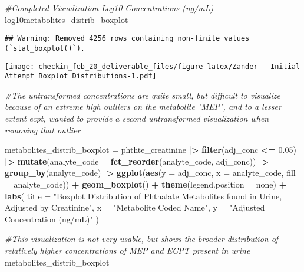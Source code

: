\documentclass[
]{article}
\newenvironment{Shaded}{\begin{snugshade}}{\end{snugshade}}
\newcommand{\AttributeTok}[1]{\textcolor[rgb]{0.13,0.29,0.53}{#1}}
\newcommand{\CommentTok}[1]{\textcolor[rgb]{0.56,0.35,0.01}{\textit{#1}}}
\newcommand{\FloatTok}[1]{\textcolor[rgb]{0.00,0.00,0.81}{#1}}
\newcommand{\FunctionTok}[1]{\textcolor[rgb]{0.13,0.29,0.53}{\textbf{#1}}}
\newcommand{\NormalTok}[1]{#1}
\newcommand{\OtherTok}[1]{\textcolor[rgb]{0.56,0.35,0.01}{#1}}
\newcommand{\SpecialCharTok}[1]{\textcolor[rgb]{0.81,0.36,0.00}{\textbf{#1}}}
\newcommand{\StringTok}[1]{\textcolor[rgb]{0.31,0.60,0.02}{#1}}
\begin{document}
\begin{Shaded}
\begin{Highlighting}[]
\CommentTok{\#Completed Visualization Log10 Concentrations (ng/mL)}
\NormalTok{log10metabolites\_distrib\_boxplot}
\end{Highlighting}
\end{Shaded}

\begin{verbatim}
## Warning: Removed 4256 rows containing non-finite values (`stat_boxplot()`).
\end{verbatim}

\texttt{[image: checkin\_feb\_20\_deliverable\_files/figure-latex/Zander - Initial Attempt Boxplot Distributions-1.pdf]}

\begin{Shaded}
\begin{Highlighting}[]
\CommentTok{\#The untransformed concentrations are quite small, but difficult to visualize because of an extreme high outliers on the metabolite "MEP", and to a lesser extent ecpt, wanted to provide a second untransformed visualization when removing that outlier}

\NormalTok{metabolites\_distrib\_boxplot }\OtherTok{=}\NormalTok{ phthte\_creatinine }\SpecialCharTok{|\textgreater{}} 
  \FunctionTok{filter}\NormalTok{(adj\_conc }\SpecialCharTok{\textless{}=} \FloatTok{0.05}\NormalTok{) }\SpecialCharTok{|\textgreater{}} 
  \FunctionTok{mutate}\NormalTok{(}\AttributeTok{analyte\_code =} \FunctionTok{fct\_reorder}\NormalTok{(analyte\_code, adj\_conc)) }\SpecialCharTok{|\textgreater{}} 
  \FunctionTok{group\_by}\NormalTok{(analyte\_code) }\SpecialCharTok{|\textgreater{}} 
  \FunctionTok{ggplot}\NormalTok{(}\FunctionTok{aes}\NormalTok{(}\AttributeTok{y =}\NormalTok{ adj\_conc, }\AttributeTok{x =}\NormalTok{ analyte\_code, }\AttributeTok{fill =}\NormalTok{ analyte\_code)) }\SpecialCharTok{+} \FunctionTok{geom\_boxplot}\NormalTok{() }\SpecialCharTok{+} \FunctionTok{theme}\NormalTok{(}\AttributeTok{legend.position =} \StringTok{\textquotesingle{}none\textquotesingle{}}\NormalTok{) }\SpecialCharTok{+}
   \FunctionTok{labs}\NormalTok{(}
    \AttributeTok{title =} \StringTok{"Boxplot Distribution of Phthalate Metabolites found in Urine, Adjusted by Creatinine"}\NormalTok{,}
    \AttributeTok{x =} \StringTok{"Metabolite Coded Name"}\NormalTok{,}
    \AttributeTok{y =} \StringTok{"Adjusted Concentration (ng/mL)"}
\NormalTok{  )}

\CommentTok{\#This visualization is not very usable, but shows the broader distribution of relatively higher concentrations of MEP and ECPT present in urine}
\NormalTok{metabolites\_distrib\_boxplot }
\end{Highlighting}
\end{Shaded}
\end{document}
